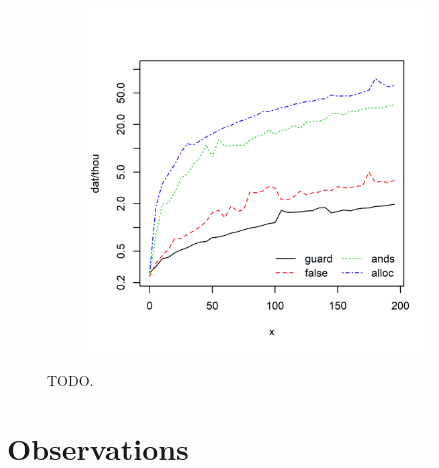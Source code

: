\begin{figure}
{\begin{subfigure}[b]{0.63\textwidth}
			\includegraphics[width=\textwidth]{experiments/check_time_1.png}
			\caption{}
			\label{fig:check_time_2}
		\end{subfigure}%
	}
	\caption[TODO]{TODO.}
	\label{fig:check_time}
\end{figure}

%

\section{Observations}
